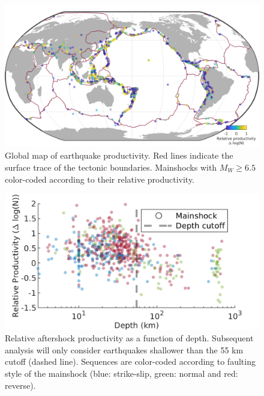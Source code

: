 \documentclass[draft]{agujournal}
\begin{document}
\begin{figure}[H]
\includegraphics[width=\linewidth]{figures/worldmap_res_mw5.png}
\caption{Global map of earthquake productivity. Red lines indicate the surface trace of the tectonic boundaries. Mainshocks with $M_W\ge6.5$ color-coded according to their relative productivity.
} 
\label{fig:global_res}
\end{figure}

\begin{figure}[H]
\centering
\includegraphics{figures/prod_vs_depth_mw5.png}
\caption{Relative aftershock productivity as a function of depth. Subsequent analysis will only consider earthquakes shallower than the 55 km cutoff (dashed line). Sequences are color-coded according to faulting style of the mainshock (blue: strike-slip, green: normal and red: reverse).}
\label{fig:prod_vs_depth}
\end{figure}
\end{document}

